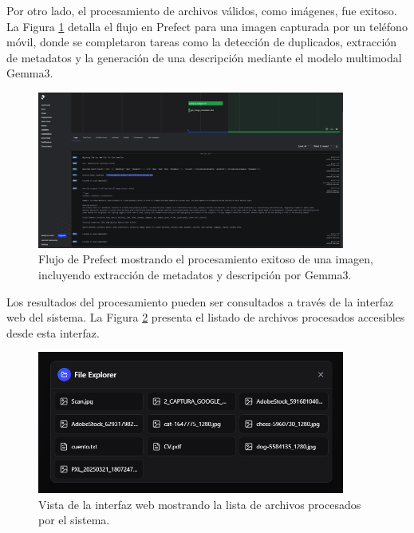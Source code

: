 Por otro lado, el procesamiento de archivos válidos, como imágenes, fue exitoso. La Figura \ref{fig:prefect_camera_success} detalla el flujo en Prefect para una imagen capturada por un teléfono móvil, donde se completaron tareas como la detección de duplicados, extracción de metadatos y la generación de una descripción mediante el modelo multimodal Gemma3.

\begin{figure}[H]
\centering
\includegraphics[width=0.9\textwidth]{archivos/prefect_camera.png}
\caption[Resultado de Prefect al procesar una imagen de móvil]{Flujo de Prefect mostrando el procesamiento exitoso de una imagen, incluyendo extracción de metadatos y descripción por Gemma3.}
\label{fig:prefect_camera_success}
\end{figure}

Los resultados del procesamiento pueden ser consultados a través de la interfaz web del sistema. La Figura \ref{fig:result_web_list} presenta el listado de archivos procesados accesibles desde esta interfaz.

\begin{figure}[H]
\centering
\includegraphics[width=0.9\textwidth]{archivos/result_web.png}
\caption[Lista de archivos procesados desde la web]{Vista de la interfaz web mostrando la lista de archivos procesados por el sistema.}
\label{fig:result_web_list}
\end{figure}

